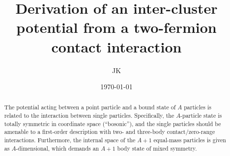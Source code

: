 \documentclass[onecolumn,preprint,superscriptaddress,nofootinbib,notitlepage,10pt,linenumbers]{revtex4-1}
\begin{document}
\title{Derivation of an inter-cluster potential from
a two-fermion contact interaction}
\author{JK}

\date{\today}

\begin{abstract}
The potential acting between a point particle and a bound state of $A$ particles
is related to the interaction between single particles. Specifically, the
$A$-particle state is totally symmetric in coordinate space (``bosonic''), and
the single particles should be amenable to a first-order description with two-
and three-body contact/zero-range interactions. Furthermore, the internal
space of the $A+1$ equal-mass particles is given as $A$-dimensional, which
demands an $A+1$ body state of mixed symmetry. 
\end{abstract}

\maketitle
\end{document}
